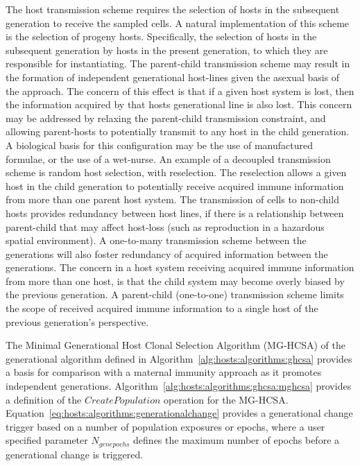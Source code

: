 The host transmission scheme requires the selection of hosts in the subsequent generation to receive the sampled cells. A natural implementation of this scheme is the selection of progeny hosts. Specifically, the selection of hosts in the subsequent generation by hosts in the present generation, to which they are responsible for instantiating. The parent-child transmission scheme may result in the formation of independent generational host-lines given the asexual basis of the approach. The concern of this effect is that if a given host system is lost, then the information acquired by that hosts generational line is also lost. This concern may be addressed by relaxing the parent-child transmission constraint, and allowing parent-hosts to potentially transmit to any host in the child generation. A biological basis for this configuration may be the use of manufactured formulae, or the use of a wet-nurse. An example of a decoupled transmission scheme is random host selection, with reselection. The reselection allows a given host in the child generation to potentially receive acquired immune information from more than one parent host system. The transmission of cells to non-child hosts provides redundancy between host lines, if there is a relationship between parent-child that may affect host-loss (such as reproduction in a hazardous spatial environment). A one-to-many transmission scheme between the generations will also foster redundancy of acquired information between the generations. The concern in a host system receiving acquired immune information from more than one host, is that the child system may become overly biased by the previous generation. A parent-child (one-to-one) transmission scheme limits the scope of received acquired immune information to a single host of the previous generation's perspective.

The Minimal Generational Host Clonal Selection Algorithm (MG-HCSA) of the generational algorithm defined in Algorithm~\ref{alg:hosts:algorithms:ghcsa} provides a basis for comparison with a maternal immunity approach as it promotes independent generations. Algorithm~\ref{alg:hosts:algorithms:ghcsa:mghcsa} provides a definition of the $CreatePopulation$ operation for the MG-HCSA. Equation~\ref{eq:hosts:algorithms:generationalchange} provides a generational change trigger based on a number of population exposures or epochs, where a user specified parameter $N_{genepochs}$ defines the maximum number of epochs before a generational change is triggered.

